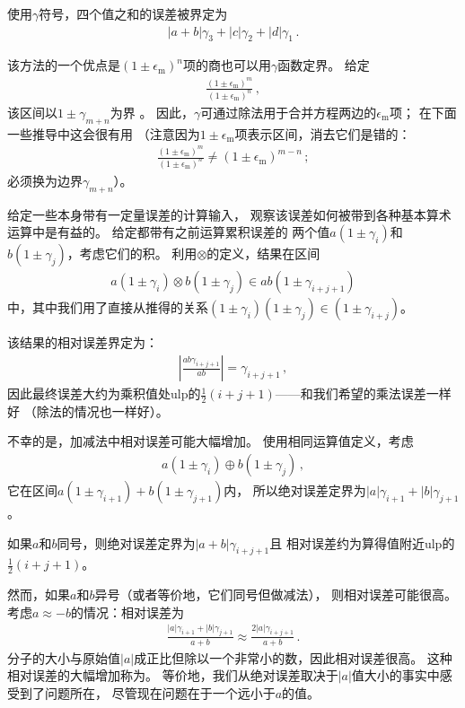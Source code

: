 使用$\gamma$符号，四个值之和的误差被界定为
\begin{align*}
    |a+b|\gamma_3+|c|\gamma_2+|d|\gamma_1\, .
\end{align*}

该方法的一个优点是$(1\pm\epsilon_{\mathrm{m}})^n$项的商也可以用$\gamma$函数定界。
给定
\begin{align*}
    \frac{(1\pm\epsilon_{\mathrm{m}})^m}{(1\pm\epsilon_{\mathrm{m}})^n}\, ,
\end{align*}
该区间以$1\pm\gamma_{m+n}$为界
。
因此，$\gamma$可通过除法用于合并方程两边的$\epsilon_{\mathrm{m}}$项；
在下面一些推导中这会很有用
（注意因为$1\pm\epsilon_{\mathrm{m}}$项表示区间，消去它们是错的：
\begin{align*}
    \frac{(1\pm\epsilon_{\mathrm{m}})^m}{(1\pm\epsilon_{\mathrm{m}})^n}\neq(1\pm\epsilon_{\mathrm{m}})^{m-n}\, ;
\end{align*}
必须换为边界$\gamma_{m+n}$）。

给定一些本身带有一定量误差的计算输入，
观察该误差如何被带到各种基本算术运算中是有益的。
给定都带有之前运算累积误差的
两个值$a(1\pm\gamma_i)$和$b(1\pm\gamma_j)$，考虑它们的积。
利用$\otimes$的定义，结果在区间
\begin{align*}
    a(1\pm\gamma_i)\otimes b(1\pm\gamma_j)\in ab(1\pm\gamma_{i+j+1})
\end{align*}
中，其中我们用了直接从推得的关系$(1\pm\gamma_i)(1\pm\gamma_j)\in(1\pm\gamma_{i+j})$。

该结果的相对误差界定为：
\begin{align*}
    \left|\frac{ab\gamma_{i+j+1}}{ab}\right|=\gamma_{i+j+1}\, ,
\end{align*}
因此最终误差大约为乘积值处ulp的$\displaystyle\frac{1}{2}(i+j+1)$——和我们希望的乘法误差一样好
（除法的情况也一样好）。

不幸的是，加减法中相对误差可能大幅增加。
使用相同运算值定义，考虑
\begin{align*}
    a(1\pm\gamma_i)\oplus b(1\pm\gamma_j)\, ,
\end{align*}
它在区间$a(1\pm\gamma_{i+1})+b(1\pm\gamma_{j+1})$内，
所以绝对误差定界为$|a|\gamma_{i+1}+|b|\gamma_{j+1}$。

如果$a$和$b$同号，则绝对误差定界为$|a+b|\gamma_{i+j+1}$且
相对误差约为算得值附近ulp的$\displaystyle\frac{1}{2}(i+j+1)$。

然而，如果$a$和$b$异号（或者等价地，它们同号但做减法），
则相对误差可能很高。考虑$a\approx-b$的情况：相对误差为
\begin{align*}
    \frac{|a|\gamma_{i+1}+|b|\gamma_{j+1}}{a+b}\approx\frac{2|a|\gamma_{i+j+1}}{a+b}\, .
\end{align*}
分子的大小与原始值$|a|$成正比但除以一个非常小的数，因此相对误差很高。
这种相对误差的大幅增加称为。
等价地，我们从绝对误差取决于$|a|$值大小的事实中感受到了问题所在，
尽管现在问题在于一个远小于$a$的值。

